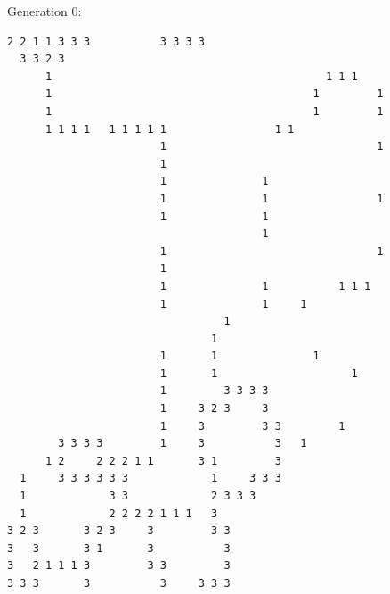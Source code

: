 \documentclass[11pt]{article} %
\begin{document}
\pagebreak
\begin{center}
Generation 0:
\begin{verbatim}
2 2 1 1 3 3 3           3 3 3 3                                 
  3 3 2 3                                                       
      1                                           1 1 1         
      1                                         1         1     
      1                                         1         1     
      1 1 1 1   1 1 1 1 1                 1 1                   
                        1                                 1     
                        1                                       
                        1               1                       
                        1               1                 1     
                        1               1                       
                                        1                       
                        1                                 1     
                        1                                       
                        1               1           1 1 1       
                        1               1     1                 
                                  1                             
                                1                               
                        1       1               1               
                        1       1                     1         
                        1         3 3 3 3                       
                        1     3 2 3     3                       
                        1     3         3 3         1           
        3 3 3 3         1     3           3   1                 
      1 2     2 2 2 1 1       3 1         3                     
  1     3 3 3 3 3 3             1     3 3 3                     
  1             3 3             2 3 3 3                         
  1             2 2 2 2 1 1 1   3                               
3 2 3       3 2 3     3         3 3                             
3   3       3 1       3           3                             
3   2 1 1 1 3         3 3         3                             
3 3 3       3           3     3 3 3                             
\end{verbatim}
\end{center}
\end{document}
